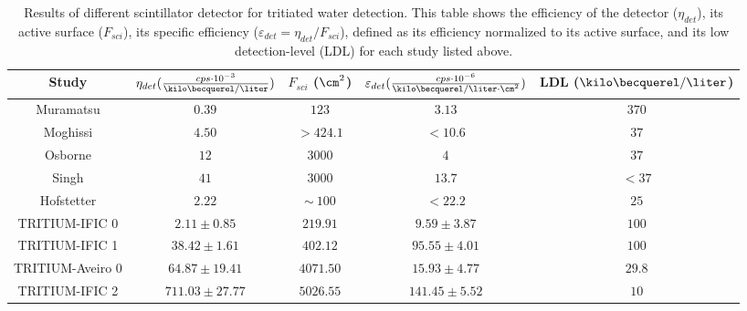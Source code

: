 \begin{table}[htbp]
\begin{center}
\begin{tabular}{|c|c|c|c|c|}
\hline
Study & \parbox{5.5em}{\centering $\eta_{det}(\frac{cps \cdot{} 10^{-3}}{\kilo\becquerel/\liter})$}  & \parbox{4.5em}{\centering $F_{sci}$ ($\cm^2$)}  & \parbox{6.5em}{\centering $\varepsilon_{det}(\frac{cps \cdot{} 10^{-6}}{\kilo\becquerel/ \liter \cdot{} \cm^2})$} & LDL ($\kilo\becquerel / \liter$)\\
\hline \hline \hline
Muramatsu & $0.39$ & $123$ & $3.13$ & $370$ \\ \hline
Moghissi & $4.50$ & $>424.1$ & $<10.6$ & $37$ \\\hline
Osborne & $12$ & $3000$ & $4$ & $37$ \\ \hline
Singh & $41$ & $3000$ & $13.7$ & $<37$ \\ \hline
Hofstetter & $2.22$ & $\sim~100$ & $<22.2$ & $25$ \\ \hline
TRITIUM-IFIC 0 & $2.11 \pm 0.85$ & $219.91$ & $9.59 \pm 3.87$ & $100$ \\ \hline
TRITIUM-IFIC 1 & $38.42 \pm 1.61$ & $402.12$ & $95.55 \pm 4.01$ & $100$ \\ \hline
TRITIUM-Aveiro 0 & $64.87 \pm 19.41$ & $4071.50$ & $15.93 \pm 4.77$ & $29.8$ \\ \hline
TRITIUM-IFIC 2 & $711.03 \pm 27.77$ & $5026.55$ & $141.45 \pm 5.52$ & $10$ \\ \hline
\end{tabular}
\caption{Results of different scintillator detector for tritiated water detection. This table shows the efficiency of the detector ($\eta_{det}$), its active surface ($F_{sci}$), its specific efficiency ($\varepsilon_{det}=\eta_{det}/F_{sci}$), defined as its efficiency normalized to its active surface, and its low detection-level (LDL) for each study listed above.}
\label{tab:ComparisonResults}
\end{center}
\end{table}